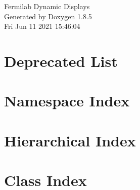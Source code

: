\documentclass[twoside]{book}
\newcommand{\clearemptydoublepage}{%
  \newpage{\pagestyle{empty}\cleardoublepage}%
}
\begin{document}
\hypersetup{pageanchor=false}
\begin{titlepage}
\vspace*{7cm}
\begin{center}%
{\Large Fermilab Dynamic Displays }\\
\vspace*{1cm}
{\large Generated by Doxygen 1.8.5}\\
\vspace*{0.5cm}
{\small Fri Jun 11 2021 15:46:04}\\
\end{center}
\end{titlepage}
\clearemptydoublepage
\tableofcontents
\clearemptydoublepage
{}
\hypersetup{pageanchor=true}

\chapter{Deprecated List}
\label{deprecated}
\hypertarget{deprecated}{}

\chapter{Namespace Index}

\chapter{Hierarchical Index}

\chapter{Class Index}

\end{document}
